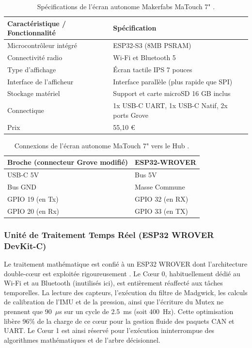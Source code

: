 \begin{table}[H]
    \centering
    \begin{tabular}{|p{6cm}|p{8cm}|}
        \hline
        \textbf{Caractéristique / Fonctionnalité} & \textbf{Spécification} \\
        \hline
        Microcontrôleur intégré & ESP32-S3 (8MB PSRAM) \\
        \hline
        Connectivité radio & Wi-Fi et Bluetooth 5 \\
        \hline
        Type d'affichage & Écran tactile IPS 7 pouces \\
        \hline
        Interface de l'afficheur & Interface parallèle (plus rapide que SPI) \\
        \hline
        Stockage matériel & Support et carte microSD 16 GB inclus \\
        \hline
        Connectique & 1x USB-C UART, 1x USB-C Natif, 2x ports Grove \\
        \hline
        Prix & 55,10 € \\
        \hline
    \end{tabular}
    \caption{Spécifications de l'écran autonome Makerfabs MaTouch 7" \cite{MaTouch_7}.}
    \label{tab:specs_matouch}
\end{table}

\begin{table}[H]
    \centering
    \begin{tabular}{|l|l|}
        \hline
        \textbf{Broche (connecteur Grove modifié)} & \textbf{ESP32-WROVER} \\
        \hline
        USB-C 5V & Bus 5V \\
        \hline
        Bus GND & Masse Commune \\
        \hline
        GPIO 19 (en Tx) & GPIO 32 (en RX) \\
        \hline
        GPIO 20 (en Rx) & GPIO 33 (en TX) \\
        \hline
    \end{tabular}
    \caption{Connexions de l'écran autonome MaTouch 7" vers le Hub \cite{MaTouch_7}.}
    \label{tab:pinout_matouch}
\end{table}

\subsubsection{Unité de Traitement Temps Réel (ESP32 WROVER DevKit-C)}

Le traitement mathématique est confié à un ESP32 WROVER dont l'architecture double-cœur est exploitée rigoureusement \cite{ESP32_WROVER}. Le Cœur 0, habituellement dédié au Wi-Fi et au Bluetooth (inutilisés ici), est entièrement réaffecté aux tâches temporelles. La lecture des capteurs, l'exécution du filtre de Madgwick, les calculs de calibration de l'IMU et de la pression, ainsi que l'écriture du Mutex ne prennent que 90~$\mu$s sur un cycle de 2.5~ms (soit 400~Hz). Cette optimisation libère 96\% de la charge de ce cœur pour la gestion fluide des paquets CAN et UART. Le Cœur 1 est ainsi réservé pour l'exécution ininterrompue des algorithmes mathématiques et de l'arbre décisionnel.

